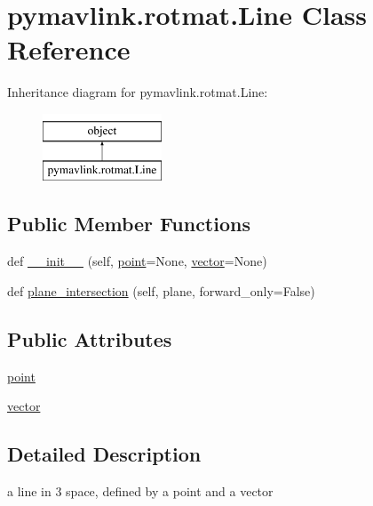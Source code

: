 \hypertarget{classpymavlink_1_1rotmat_1_1Line}{}\section{pymavlink.\+rotmat.\+Line Class Reference}
\label{classpymavlink_1_1rotmat_1_1Line}
Inheritance diagram for pymavlink.\+rotmat.\+Line\+:\begin{figure}[H]
\begin{center}
\leavevmode
\includegraphics[height=2.000000cm]{classpymavlink_1_1rotmat_1_1Line}
\end{center}
\end{figure}
\subsection*{Public Member Functions}
\begin{DoxyCompactItemize}
\item 
def \mbox{\hyperlink{classpymavlink_1_1rotmat_1_1Line_a885c853f5c7389037763a1c096e3522b}{\+\_\+\+\_\+init\+\_\+\+\_\+}} (self, \mbox{\hyperlink{classpymavlink_1_1rotmat_1_1Line_ae9557b1db18c60cf9a0a06b1b17e739c}{point}}=None, \mbox{\hyperlink{classpymavlink_1_1rotmat_1_1Line_adaf0efb163f4cf8833c57d8f188757be}{vector}}=None)
\item 
def \mbox{\hyperlink{classpymavlink_1_1rotmat_1_1Line_a798d84ee7809f0fd49a80421776f78b4}{plane\+\_\+intersection}} (self, plane, forward\+\_\+only=False)
\end{DoxyCompactItemize}
\subsection*{Public Attributes}
\begin{DoxyCompactItemize}
\item 
\mbox{\hyperlink{classpymavlink_1_1rotmat_1_1Line_ae9557b1db18c60cf9a0a06b1b17e739c}{point}}
\item 
\mbox{\hyperlink{classpymavlink_1_1rotmat_1_1Line_adaf0efb163f4cf8833c57d8f188757be}{vector}}
\end{DoxyCompactItemize}


\subsection{Detailed Description}
\begin{DoxyVerb}a line in 3 space, defined by a point and a vector\end{DoxyVerb}
 

